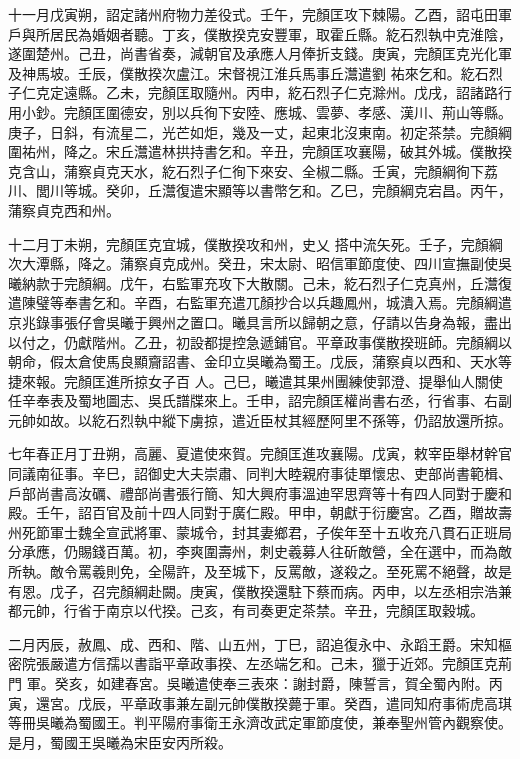 \begin{pinyinscope}
 十一月戊寅朔，詔定諸州府物力差役式。壬午，完顏匡攻下棘陽。乙酉，詔屯田軍戶與所居民為婚姻者聽。丁亥，僕散揆克安豐軍，取霍丘縣。紇石烈執中克淮陰，遂圍楚州。己丑，尚書省奏，減朝官及承應人月俸折支錢。庚寅，完顏匡克光化軍及神馬坡。壬辰，僕散揆次盧江。宋督視江淮兵馬事丘灊遣劉
 祐來乞和。紇石烈子仁克定遠縣。乙未，完顏匡取隨州。丙申，紇石烈子仁克滁州。戊戌，詔諸路行用小鈔。完顏匡圍德安，別以兵徇下安陸、應城、雲夢、孝感、漢川、荊山等縣。庚子，日斜，有流星二，光芒如炬，幾及一丈，起東北沒東南。初定茶禁。完顏綱圍祐州，降之。宋丘灊遣林拱持書乞和。辛丑，完顏匡攻襄陽，破其外城。僕散揆克含山，蒲察貞克天水，紇石烈子仁徇下來安、全椒二縣。壬寅，完顏綱徇下荔川、閭川等城。癸卯，丘灊復遣宋顯等以書幣乞和。乙巳，完顏綱克宕昌。丙午，蒲察貞克西和州。



 十二月丁未朔，完顏匡克宜城，僕散揆攻和州，史乂
 搭中流矢死。壬子，完顏綱次大潭縣，降之。蒲察貞克成州。癸丑，宋太尉、昭信軍節度使、四川宣撫副使吳曦納款于完顏綱。戊午，右監軍充攻下大散關。己未，紇石烈子仁克真州，丘灊復遣陳璧等奉書乞和。辛酉，右監軍充遣兀顏抄合以兵趣鳳州，城潰入焉。完顏綱遣京兆錄事張仔會吳曦于興州之置口。曦具言所以歸朝之意，仔請以告身為報，盡出以付之，仍獻階州。乙丑，初設都提控急遞鋪官。平章政事僕散揆班師。完顏綱以朝命，假太倉使馬良顯齎詔書、金印立吳曦為蜀王。戊辰，蒲察貞以西和、天水等捷來報。完顏匡進所掠女子百
 人。己巳，曦遣其果州團練使郭澄、提舉仙人關使任辛奉表及蜀地圖志、吳氏譜牒來上。壬申，詔完顏匡權尚書右丞，行省事、右副元帥如故。以紇石烈執中縱下虜掠，遣近臣杖其經歷阿里不孫等，仍詔放還所掠。



 七年春正月丁丑朔，高麗、夏遣使來賀。完顏匡進攻襄陽。戊寅，敕宰臣舉材幹官同議南征事。辛巳，詔御史大夫崇肅、同判大睦親府事徒單懷忠、吏部尚書範楫、戶部尚書高汝礪、禮部尚書張行簡、知大興府事溫迪罕思齊等十有四人同對于慶和殿。壬午，詔百官及前十四人同對于廣仁殿。甲申，朝獻于衍慶宮。乙酉，贈故壽
 州死節軍士魏全宣武將軍、蒙城令，封其妻鄉君，子俟年至十五收充八貫石正班局分承應，仍賜錢百萬。初，李爽圍壽州，刺史羲募人往斫敵營，全在選中，而為敵所執。敵令罵羲則免，全陽許，及至城下，反罵敵，遂殺之。至死罵不絕聲，故是有恩。戊子，召完顏綱赴闕。庚寅，僕散揆還駐下蔡而病。丙申，以左丞相宗浩兼都元帥，行省于南京以代揆。己亥，有司奏更定茶禁。辛丑，完顏匡取穀城。



 二月丙辰，赦鳳、成、西和、階、山五州，丁巳，詔追復永中、永蹈王爵。宋知樞密院張嚴遣方信孺以書詣平章政事揆、左丞端乞和。己未，獵于近郊。完顏匡克荊門
 軍。癸亥，如建春宮。吳曦遣使奉三表來：謝封爵，陳誓言，賀全蜀內附。丙寅，還宮。戊辰，平章政事兼左副元帥僕散揆薨于軍。癸酉，遣同知府事術虎高琪等冊吳曦為蜀國王。判平陽府事衛王永濟改武定軍節度使，兼奉聖州管內觀察使。是月，蜀國王吳曦為宋臣安丙所殺。




\end{pinyinscope}
